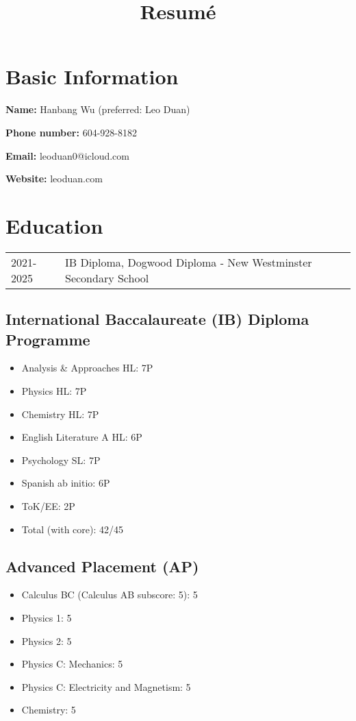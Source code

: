 \documentclass{article}
\title{\textbf{Resumé}}
\author{}
\date{}
\begin{document}
\maketitle

\section*{Basic Information}

\textbf{Name:} Hanbang Wu (preferred: Leo Duan)

\textbf{Phone number:} 604-928-8182

\textbf{Email:} leoduan0@icloud.com

\textbf{Website:} leoduan.com

\section*{Education}

\begin{tabular}{@{}ll}
	2021-2025 & IB Diploma, Dogwood Diploma - New Westminster Secondary School \\
\end{tabular}

\subsection*{International Baccalaureate (IB) Diploma Programme}

\begin{itemize}
  \item Analysis & Approaches HL: 7P
\item Physics HL: 7P
\item Chemistry HL: 7P
\item English Literature A HL: 6P
\item Psychology SL: 7P
\item Spanish ab initio: 6P
\item ToK/EE: 2P
\item Total (with core): 42/45
\end{itemize}

\subsection*{Advanced Placement (AP)}

\begin{itemize}
\item Calculus BC (Calculus AB subscore: 5): 5
\item Physics 1: 5
\item Physics 2: 5
\item Physics C: Mechanics: 5
\item Physics C: Electricity and Magnetism: 5
\item Chemistry: 5
\end{itemize}
\end{document}

